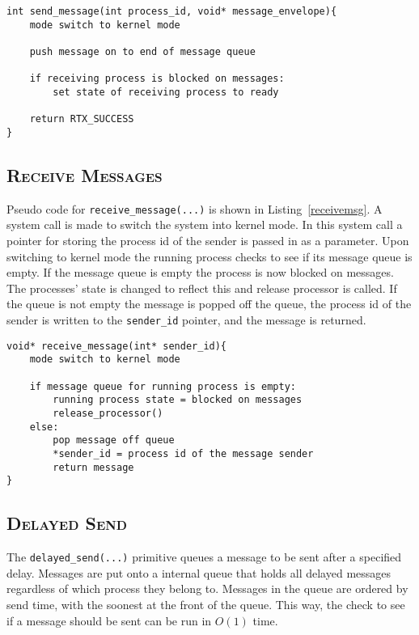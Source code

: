 \documentclass[oneside]{report}
\begin{document}
\begin{lstlisting}
int send_message(int process_id, void* message_envelope){
    mode switch to kernel mode

    push message on to end of message queue

    if receiving process is blocked on messages:
        set state of receiving process to ready

    return RTX_SUCCESS
}
\end{lstlisting}

\subsection{\textsc{Receive Messages}}
Pseudo code for \texttt{receive\_message(...)} is shown in
Listing~\ref{receivemsg}. A system call is made to switch the system
into kernel mode. In this system call a pointer for storing the
process id of the sender is passed in as a parameter. Upon switching
to kernel mode the running process checks to see if its message queue
is empty. If the message queue is empty the process is now blocked on
messages. The processes' state is changed to reflect this and release
processor is called. If the queue is not empty the message is popped
off the queue, the process id of the sender is written to the
\texttt{sender\_id} pointer, and the message is returned.

\begin{lstlisting}
void* receive_message(int* sender_id){
    mode switch to kernel mode

    if message queue for running process is empty:
        running process state = blocked on messages
        release_processor()
    else:
        pop message off queue
        *sender_id = process id of the message sender
        return message      
}
\end{lstlisting}

\subsection{\textsc{Delayed Send}}
The \texttt{delayed\_send(...)} primitive queues a message to be sent
after a specified delay. Messages are put onto a internal queue that
holds all delayed messages regardless of which process they belong to.
Messages in the queue are ordered by send time, with the soonest at
the front of the queue. This way, the check to see if a message should
be sent can be run in $O(1)$ time.
\end{document}
